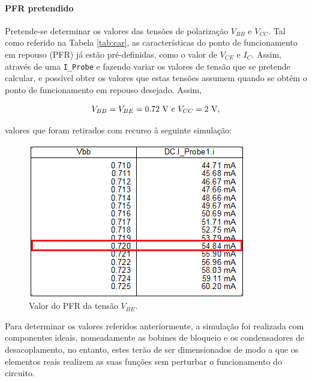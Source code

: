 \documentclass[11pt]{article}
\numberwithin{equation}{section}
\begin{document}
\paragraph{PFR pretendido} \hspace{0pt} 

Pretende-se determinar os valores das tensões de polarização $V_{BB}$ e $V_{CC}$. Tal como referido na Tabela \ref{tab:car}, as características do ponto de funcionamento em repouso (PFR) já estão pré-definidas, como o valor de $V_{CE}$ e $I_{C}$. Assim, através de uma \texttt{I\_Probe} e fazendo variar os valores de tensão que se pretende calcular, e possível obter os valores que estas tensões assumem quando se obtém o ponto de funcionamento em repouso desejado. Assim,

\vspace{-3mm}
\begin{equation}
\centering
V_{BB} = V_{BE} = 0.72~\text{V} ~ e ~ V_{CC} = 2~\text{V},
\end{equation}

\vspace{1mm} 
valores que foram retirados com recurso à seguinte simulação:

\begin{figure}[h]
\centering
\includegraphics[keepaspectratio=true, scale=0.35]{exps/Vbb}
\vspace{-0.5em}
\caption{Valor do PFR da tensão $V_{BE}$.}
\vspace{-0.8em}
\end{figure}

Para determinar os valores referidos anteriormente, a simulação foi realizada com componentes ideais, nomeadamente as bobines de bloqueio e os condensadores de desacoplamento, no entanto, estes terão de ser dimensionados de modo a que os elementos reais realizem as suas funções sem perturbar o funcionamento do circuito.
\end{document}
